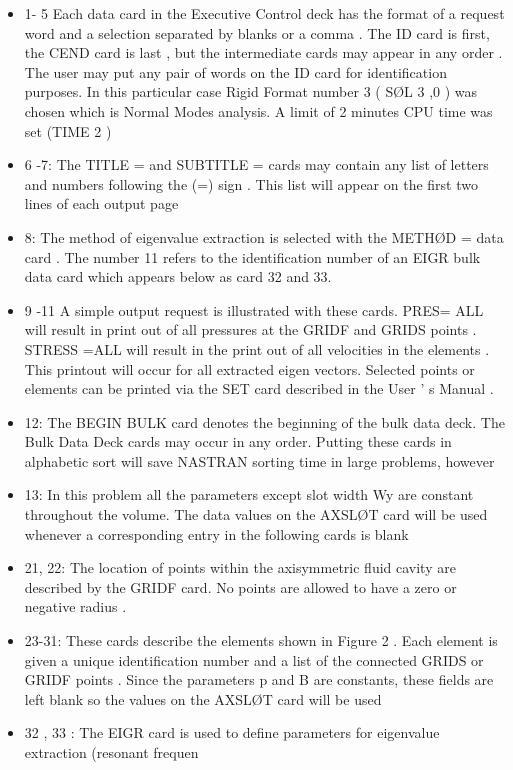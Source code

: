 \documentclass{article}
\begin{document}
\begin{itemize}
	\item 1- 5
Each data card in the Executive Control deck has the format of a request word and a
selection separated by blanks or a comma . The ID card is first, the CEND card is last ,
but the intermediate cards may appear in any order . The user may put any pair of words
on the ID card for identification purposes. In this particular case Rigid Format
number 3 ( SØL 3 ,0 ) was chosen which is Normal Modes analysis. A limit of 2 minutes
CPU time was set (TIME 2 )
	\item 6 -7:  The TITLE = and SUBTITLE = cards may contain any list of letters and numbers following the
(=) sign . This list will appear on the first two lines of each output page
	\item 8: The method of eigenvalue extraction is selected with the METHØD = data card .
The number
11 refers to the identification number of an EIGR bulk data card which appears below as
card 32 and 33.
	\item 9 -11 A simple output request is illustrated with these cards. PRES= ALL will result in print
out of all pressures at the GRIDF and GRIDS points .
STRESS =ALL will result in the print
out of all velocities in the elements . This printout will occur for all extracted eigen
vectors. Selected points or elements can be printed via the SET card described in the
User ' s Manual .
\item 12: The BEGIN BULK card denotes the beginning of the bulk data deck. The Bulk Data Deck
cards may occur in any order. Putting these cards in alphabetic sort will save NASTRAN
sorting time in large problems, however
\item 13: In this problem all the parameters except slot width Wy are constant throughout the
volume.
The data values on the AXSLØT card will be used whenever a corresponding entry
in the following cards is blank
\item 21, 22:
The location of points within the axisymmetric fluid cavity are described by the GRIDF
card. No points are allowed to have a zero or negative radius .
\item 23-31:
These cards describe the elements shown in Figure 2 . Each element is given a unique
identification number and a list of the connected GRIDS or GRIDF points . Since the
parameters p and B are constants, these fields are left blank so the values on the AXSLØT
card will be used
\item 32 , 33 :
The EIGR card is used to define parameters for eigenvalue extraction (resonant frequen

\end{itemize}
\end{document}
